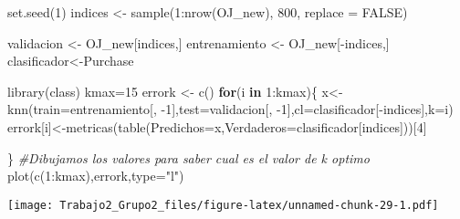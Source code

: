 \documentclass[
]{article}
\newenvironment{Shaded}{\begin{snugshade}}{\end{snugshade}}
\newcommand{\AttributeTok}[1]{\textcolor[rgb]{0.77,0.63,0.00}{#1}}
\newcommand{\CommentTok}[1]{\textcolor[rgb]{0.56,0.35,0.01}{\textit{#1}}}
\newcommand{\ConstantTok}[1]{\textcolor[rgb]{0.00,0.00,0.00}{#1}}
\newcommand{\ControlFlowTok}[1]{\textcolor[rgb]{0.13,0.29,0.53}{\textbf{#1}}}
\newcommand{\DecValTok}[1]{\textcolor[rgb]{0.00,0.00,0.81}{#1}}
\newcommand{\FunctionTok}[1]{\textcolor[rgb]{0.00,0.00,0.00}{#1}}
\newcommand{\NormalTok}[1]{#1}
\newcommand{\OtherTok}[1]{\textcolor[rgb]{0.56,0.35,0.01}{#1}}
\newcommand{\SpecialCharTok}[1]{\textcolor[rgb]{0.00,0.00,0.00}{#1}}
\newcommand{\StringTok}[1]{\textcolor[rgb]{0.31,0.60,0.02}{#1}}
\begin{document}
\begin{Shaded}
\begin{Highlighting}[]
\FunctionTok{set.seed}\NormalTok{(}\DecValTok{1}\NormalTok{)}
\NormalTok{indices }\OtherTok{\textless{}{-}} \FunctionTok{sample}\NormalTok{(}\DecValTok{1}\SpecialCharTok{:}\FunctionTok{nrow}\NormalTok{(OJ\_new), }\DecValTok{800}\NormalTok{, }\AttributeTok{replace =} \ConstantTok{FALSE}\NormalTok{)}

\NormalTok{validacion }\OtherTok{\textless{}{-}}\NormalTok{ OJ\_new[indices,]}
\NormalTok{entrenamiento }\OtherTok{\textless{}{-}}\NormalTok{ OJ\_new[}\SpecialCharTok{{-}}\NormalTok{indices,]}
\NormalTok{clasificador}\OtherTok{\textless{}{-}}\NormalTok{Purchase}

\FunctionTok{library}\NormalTok{(class)}
\NormalTok{kmax}\OtherTok{=}\DecValTok{15}
\NormalTok{errork }\OtherTok{\textless{}{-}} \FunctionTok{c}\NormalTok{()}
\ControlFlowTok{for}\NormalTok{(i }\ControlFlowTok{in} \DecValTok{1}\SpecialCharTok{:}\NormalTok{kmax)\{}
\NormalTok{  x}\OtherTok{\textless{}{-}}\FunctionTok{knn}\NormalTok{(}\AttributeTok{train=}\NormalTok{entrenamiento[, }\SpecialCharTok{{-}}\DecValTok{1}\NormalTok{],}\AttributeTok{test=}\NormalTok{validacion[, }\SpecialCharTok{{-}}\DecValTok{1}\NormalTok{],}\AttributeTok{cl=}\NormalTok{clasificador[}\SpecialCharTok{{-}}\NormalTok{indices],}\AttributeTok{k=}\NormalTok{i)}
\NormalTok{errork[i]}\OtherTok{\textless{}{-}}\FunctionTok{metricas}\NormalTok{(}\FunctionTok{table}\NormalTok{(}\AttributeTok{Predichos=}\NormalTok{x,}\AttributeTok{Verdaderos=}\NormalTok{clasificador[indices]))[}\DecValTok{4}\NormalTok{]}

\NormalTok{\}}
\CommentTok{\#Dibujamos los valores para saber cual es el valor de k optimo }
\FunctionTok{plot}\NormalTok{(}\FunctionTok{c}\NormalTok{(}\DecValTok{1}\SpecialCharTok{:}\NormalTok{kmax),errork,}\AttributeTok{type=}\StringTok{"l"}\NormalTok{)}
\end{Highlighting}
\end{Shaded}

\texttt{[image: Trabajo2\_Grupo2\_files/figure-latex/unnamed-chunk-29-1.pdf]}
\end{document}
